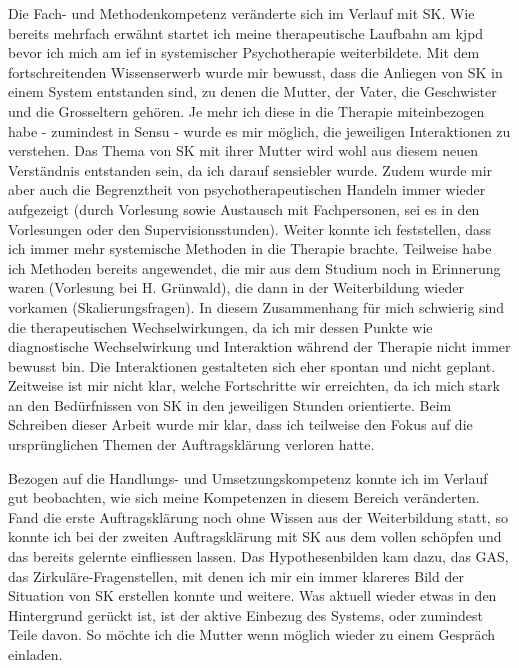 Die Fach- und Methodenkompetenz veränderte sich im Verlauf mit SK. Wie bereits mehrfach erwähnt startet ich meine therapeutische Laufbahn am \ac{kjpd} bevor ich mich am \ac{ief} in systemischer Psychotherapie weiterbildete. Mit dem fortschreitenden Wissenserwerb wurde mir bewusst, dass die Anliegen von SK in einem System entstanden sind, zu denen die Mutter, der Vater, die Geschwister und die Grosseltern gehören. Je mehr ich diese in die Therapie miteinbezogen habe - zumindest in Sensu - wurde es mir möglich, die jeweiligen Interaktionen zu verstehen. Das Thema von SK mit ihrer Mutter wird wohl aus diesem neuen Verständnis entstanden sein, da ich darauf sensiebler wurde. Zudem wurde mir aber auch die Begrenztheit von psychotherapeutischen Handeln immer wieder aufgezeigt (durch Vorlesung sowie Austausch mit Fachpersonen, sei es in den Vorlesungen oder den Supervisionsstunden). Weiter konnte ich feststellen, dass ich immer mehr systemische Methoden in die Therapie brachte. Teilweise habe ich Methoden bereits angewendet, die mir aus dem Studium noch in Erinnerung waren (Vorlesung bei H. Grünwald), die dann in der Weiterbildung wieder vorkamen (Skalierungsfragen). In diesem Zusammenhang für mich schwierig sind die therapeutischen Wechselwirkungen, da ich mir dessen Punkte wie diagnostische Wechselwirkung und Interaktion während der Therapie nicht immer bewusst bin. Die Interaktionen gestalteten sich eher spontan und nicht geplant. Zeitweise ist mir nicht klar, welche Fortschritte wir erreichten, da ich mich stark an den Bedürfnissen von SK in den jeweiligen Stunden orientierte. Beim Schreiben dieser Arbeit wurde mir klar, dass ich teilweise den Fokus auf die ursprünglichen Themen der Auftragsklärung verloren hatte. 

Bezogen auf die Handlungs- und Umsetzungskompetenz konnte ich im Verlauf gut beobachten, wie sich meine Kompetenzen in diesem Bereich veränderten. Fand die erste Auftragsklärung noch ohne Wissen aus der Weiterbildung statt, so konnte ich bei der zweiten Auftragsklärung mit SK aus dem vollen schöpfen und das bereits gelernte einfliessen lassen. Das Hypothesenbilden kam dazu, das GAS, das Zirkuläre-Fragenstellen, mit denen ich mir ein immer klareres Bild der Situation von SK erstellen konnte und weitere. Was aktuell wieder etwas in den Hintergrund gerückt ist, ist der aktive Einbezug des Systems, oder zumindest Teile davon. So möchte ich die Mutter wenn möglich wieder zu einem Gespräch einladen. 

